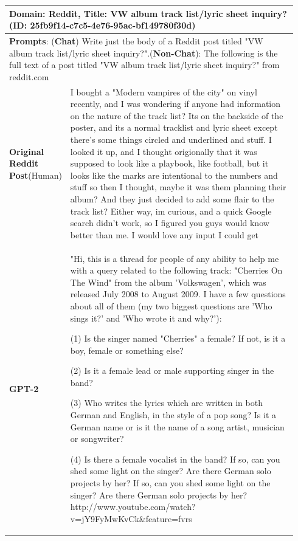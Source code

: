 \documentclass[11pt]{article}
\begin{document}
\begin{table}
\centering 
\small
\begin{tabular}{p{0.11\linewidth}|p{0.83\linewidth}} 
\toprule
\multicolumn{2}{p{0.94\linewidth}}{\textbf{Domain}: Reddit, \textbf{Title}: VW album track list/lyric sheet inquiry? (\textbf{ID}: 25fb9f14-c7c5-4e76-95ac-bf149780f30d)}\\
\midrule
\multicolumn{2}{p{0.94\linewidth}}{\textbf{Prompts}: (\textbf{Chat}) Write just the body of a Reddit post titled "VW album track list/lyric sheet inquiry?".\newline\quad(\textbf{Non-Chat}): The following is the full text of a post titled "VW album track list/lyric sheet inquiry?" from reddit.com}\\
\midrule
\textbf{Original Reddit Post}\newline (Human)&I bought a "Modern vampires of the city" on vinyl recently, and I was wondering if anyone had information on the nature of the track list? Its on the backside of the poster, and its a normal tracklist and lyric sheet except there's some things circled and underlined and stuff. I looked it up, and I thought origionally that it was supposed to look like a playbook, like football, but it looks like the marks are intentional to the numbers and stuff so then I thought, maybe it was them planning their album? And they just decided to add some flair to the track list? Either way, im curious, and a quick Google search didn't work, so I figured you guys would know better than me. I would love any input I could get\\
\midrule
\textbf{GPT-2}&"Hi, this is a thread for people of any ability to help me with a query related to the following track: "Cherries On The Wind" from the album 'Volkswagen', which was released July 2008 to August 2009. I have a few questions about all of them (my two biggest questions are 'Who sings it?' and 'Who wrote it and why?'):

(1) Is the singer named "Cherries" a female? If not, is it a boy, female or something else?

(2) Is it a female lead or male supporting singer in the band?

(3) Who writes the lyrics which are written in both German and English, in the style of a pop song? Is it a German name or is it the name of a song artist, musician or songwriter?

(4) Is there a female vocalist in the band? If so, can you shed some light on the singer? Are there German solo projects by her? If so, can you shed some light on the singer? Are there German solo projects by her? http://www.youtube.com/watch?v=jY9FyMwKvCk\&feature=fvrs



\end{tabular}
\end{table}
\end{document}
